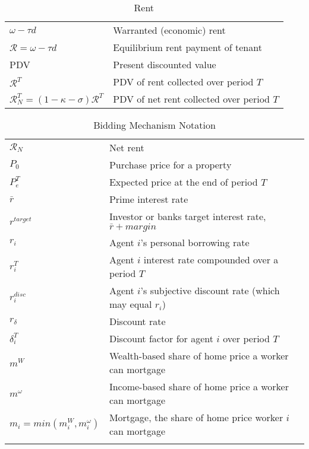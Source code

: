 \begin{longtable}{lp{10cm}}
\caption{Rent}                                                            \\
\hline
$\omega-\tau d$               &  Warranted (economic) rent                \\
$\mathcal{R}=\omega-\tau d$   &  Equilibrium rent payment of tenant       \\
PDV                           &  Present discounted value                 \\  
$\mathcal{R}^T$               &  PDV of rent collected over period $T$    \\ 
$\mathcal{R}^T_N=(1-\kappa-\sigma)\mathcal{R}^T$  &  PDV of net rent collected over period $T$ \\
\hline
\end{longtable}

\begin{longtable}{lp{10cm}}
\caption{Bidding Mechanism Notation}                                          \\
\hline
$\mathcal{R}_N$  &  Net rent                                                  \\ %
$P_0$            &  Purchase price for a property                             \\
$P^T_e$          &  Expected price at the end of period $T$                   \\
$\bar r$         &  Prime interest rate                                       \\
$r^{target}$     &  Investor or banks target interest rate, $\bar r + margin$ \\
$r_i$            &  Agent $i$'s personal borrowing rate                       \\
$r_i^T$          &  Agent $i$ interest rate compounded over a period $T$      \\
$r_i^{disc}$     &  Agent $i$'s subjective discount rate (which may equal $r_i$) \\
$r_\delta$       &  Discount rate                                             \\ %
$\delta_i^T$     &  Discount factor for agent $i$ over period $T$             \\
$m^W$            &  Wealth-based share of home price a worker can mortgage    \\ %
$m^\omega$       &  Income-based share of home price a worker can mortgage    \\ %
$m_i = min(m^W_i, m^\omega_i)$  & Mortgage, the share of home price worker $i$ can mortgage \\

\hline
\color{black}
\end{longtable}  

